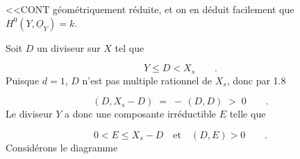 
<<CONT géométriquement réduite, et on en déduit facilement que $H^0(Y,\underline{O}_Y) = k$.

Soit $D$ un diviseur sur $X$ tel que

\begin{equation*}
Y \leq D < X_s \qquad .
\end{equation*}
Puisque $d = 1$, $D$ n'est pas multiple rationnel de $X_s$, donc par 1.8

\begin{equation*}
(D,X_s-D) \;=\; - \,(D,D) \;>\; 0 \qquad .
\end{equation*}
Le diviseur $Y$ a donc une composante irréductible $E$ telle que

\begin{equation*}
0 < E \leq X_s-D \quad \text{et} \quad (D,E) > 0 \qquad .
\end{equation*}
Considérons le diagramme

